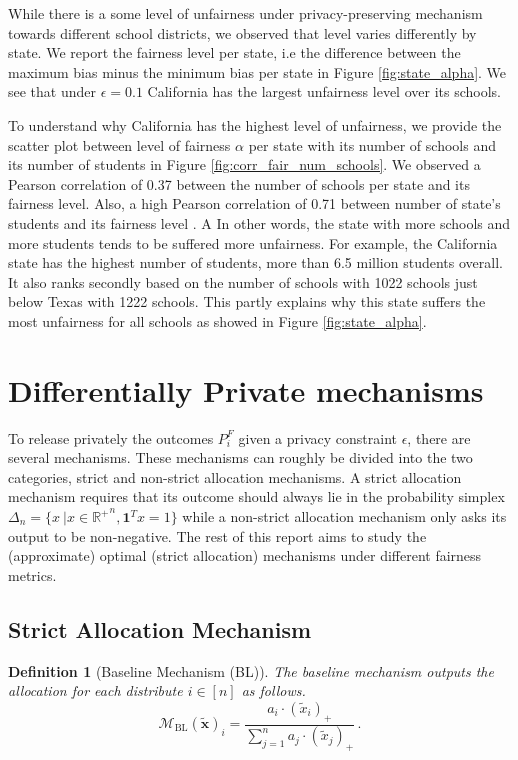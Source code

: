 \documentclass[9pt,twocolumn,twoside,lineno]{pnas-new}
\newtheorem{definition}{Definition}
\newcommand{\cM}{\mathcal{M}}
\newcommand{\noisydata}{\tilde{\bm{x}}}
\newcommand{\relu}[1]{\left(#1\right)_+}
\newcommand{\blmech}[1]{\cM_{\mathrm{BL}}\left(#1\right)}
\begin{document}
While there is a some level of unfairness under privacy-preserving mechanism towards different school districts,  we observed that level varies differently by state. We report the fairness level per state, i.e the difference between the maximum bias minus the minimum bias per state in Figure \ref{fig:state_alpha}. We see that under $\epsilon = 0.1$ California has the largest unfairness level over its schools.   

To understand why California has the highest  level of unfairness,  we provide the scatter plot between level of fairness $\alpha$ per state with its number of schools and its number of students in Figure \ref{fig:corr_fair_num_schools}. We observed a Pearson correlation of 0.37 between the number of schools per state and its fairness level. Also, a high Pearson correlation of 0.71 between number of state's students and its fairness level . A In other words, the state with more schools and more students tends to be suffered more unfairness. For example, the California state has the highest number of students, more than 6.5 million students overall. It also ranks secondly based on the number of schools with  1022 schools just below Texas with 1222 schools. This partly explains why this state suffers the most unfairness for all schools as showed in Figure \ref{fig:state_alpha}. 


\section*{Differentially Private mechanisms}
To release privately the outcomes $P^F_i$ given a privacy constraint $\epsilon$, there are several mechanisms. These mechanisms can roughly be divided into the two categories, strict and non-strict allocation mechanisms. A strict allocation mechanism requires that
its outcome should always lie in the probability simplex $\Delta_n = \{x \  | x \in {\mathbb{R}^{+}}^{n}, \boldsymbol{1}^T x =1 \}$ while a non-strict allocation mechanism
only asks its output to be non-negative. The rest of this report aims to study the (approximate) optimal
(strict allocation) mechanisms under different fairness metrics.
    \subsection*{Strict Allocation Mechanism}
    
    \begin{definition}[Baseline Mechanism (BL)]
        The \emph{baseline mechanism} outputs the allocation for each distribute $i\in [n]$ as follows.
        \begin{equation*}
            \blmech{\noisydata}_i = \frac{a_i\cdot \relu{\tilde{x}_i}}{\sum_{j=1}^n a_j\cdot \relu{\tilde{x}_j}}\,.
        \end{equation*}
    \end{definition}
    
\end{document}
